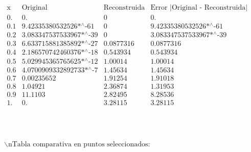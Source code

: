 \documentclass{article}
\begin{document}
\noindent\(\begin{array}{cccc}
 \text{x} & \text{Original} & \text{Reconstruida} & \text{Error $|$Original - Reconstruida$|$} \\
 0. & 0. & 0 & 0. \\
 0.1 & \text{9.42335380532526$\grave{ }$*${}^{\wedge}$-61} & 0 & \text{9.42335380532526$\grave{ }$*${}^{\wedge}$-61} \\
 0.2 & \text{3.083347537533967$\grave{ }$*${}^{\wedge}$-39} & 0 & \text{3.083347537533967$\grave{ }$*${}^{\wedge}$-39} \\
 0.3 & \text{6.633715881385892$\grave{ }$*${}^{\wedge}$-27} & 0.0877316 & 0.0877316 \\
 0.4 & \text{2.186570742460376$\grave{ }$*${}^{\wedge}$-18} & 0.543934 & 0.543934 \\
 0.5 & \text{5.029945365765625$\grave{ }$*${}^{\wedge}$-12} & 1.00014 & 1.00014 \\
 0.6 & \text{4.0700909332892733$\grave{ }$*${}^{\wedge}$-7} & 1.45634 & 1.45634 \\
 0.7 & 0.00235652 & 1.91254 & 1.91018 \\
 0.8 & 1.04921 & 2.36874 & 1.31953 \\
 0.9 & 11.1103 & 2.82495 & 8.28536 \\
 1. & 0. & 3.28115 & 3.28115 \\
\end{array}\)

\noindent\(\begin{array}{cc}
 
\begin{array}{cc}
  &  \\
\end{array}
 &  \\
\end{array}\)

\noindent\(\text{$\backslash $nTabla comparativa en puntos seleccionados:}\)
\end{document}
